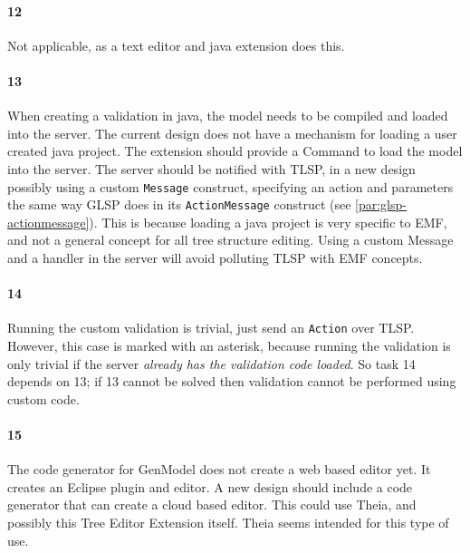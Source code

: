 \paragraph{12} Not applicable, as a text editor and java extension does this.

\paragraph{13} When creating a validation in java, the model needs to be compiled and loaded into the server.
The current design does not have a mechanism for loading a user created java project.
The extension should provide a Command to load the model into the server.
The server should be notified with \acrshort{TLSP}, in a new design possibly using a custom \texttt{Message} construct, specifying an action and parameters the same way \acrshort{GLSP} does in its \texttt{ActionMessage} construct (see \cref{par:glsp-actionmessage}).
This is because loading a java project is very specific to \acrshort{EMF}, and not a general concept for all tree structure editing.
Using a custom Message and a handler in the server will avoid polluting \acrshort{TLSP} with \acrshort{EMF} concepts.

\paragraph{14} Running the custom validation is trivial, just send an \texttt{Action} over \acrshort{TLSP}.
However, this case is marked with an asterisk, because running the validation is only trivial if the server \textit{already has the validation code loaded}.
So task 14 depends on 13; if 13 cannot be solved then validation cannot be performed using custom code.

\paragraph{15} The code generator for GenModel does not create a web based editor yet.
It creates an \gls{Eclipse} plugin and editor.
A new design should include a code generator that can create a cloud based editor.
This could use \gls{Theia}, and possibly this Tree Editor Extension itself.
Theia seems intended for this type of use.
